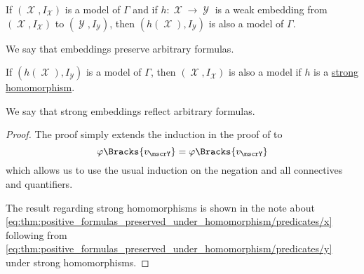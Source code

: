 \begin{proposition}\label{thm:arbitrary_formulas_preserved_under_isomorphisms}
  If \( (\mscrX, I_\mscrX) \) is a model of \( \Gamma \) and if \( h: \mscrX \to \mscrY \) is a weak embedding from \( (\mscrX, I_\mscrX) \) to \( (\mscrY, I_\mscrY) \), then \( (h(\mscrX), I_\mscrY) \) is also a model of \( \Gamma \).

  We say that embeddings preserve arbitrary formulas.

  If \( (h(\mscrX), I_\mscrY) \) is a model of \( \Gamma \), then \( (\mscrX, I_\mscrX) \) is also a model if \( h \) is a \hyperref[rem:first_order_strong_homomorphism]{strong homomorphism}.

  We say that strong embeddings reflect arbitrary formulas.
\end{proposition}
\begin{proof}
  The proof simply extends the induction in the proof of  to
  \begin{equation*}
    \varphi\Bracks{v_\mscrY} = \varphi\Bracks{v_\mscrY}
  \end{equation*}
  which allows us to use the usual induction on the negation and all connectives and quantifiers.

  The result regarding strong homomorphisms is shown in the note about \eqref{eq:thm:positive_formulas_preserved_under_homomorphism/predicates/x} following from \eqref{eq:thm:positive_formulas_preserved_under_homomorphism/predicates/y} under strong homomorphisms.
\end{proof}

